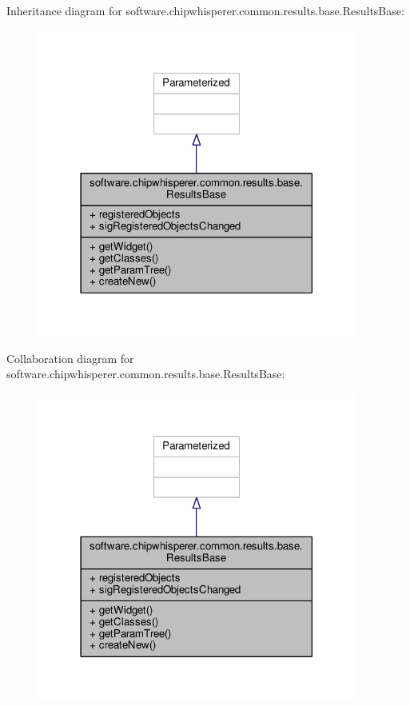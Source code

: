 Inheritance diagram for software.\+chipwhisperer.\+common.\+results.\+base.\+Results\+Base\+:\nopagebreak
\begin{figure}[H]
\begin{center}
\leavevmode
\includegraphics[width=297pt]{d5/df9/classsoftware_1_1chipwhisperer_1_1common_1_1results_1_1base_1_1ResultsBase__inherit__graph}
\end{center}
\end{figure}


Collaboration diagram for software.\+chipwhisperer.\+common.\+results.\+base.\+Results\+Base\+:\nopagebreak
\begin{figure}[H]
\begin{center}
\leavevmode
\includegraphics[width=297pt]{d0/d40/classsoftware_1_1chipwhisperer_1_1common_1_1results_1_1base_1_1ResultsBase__coll__graph}
\end{center}
\end{figure}


